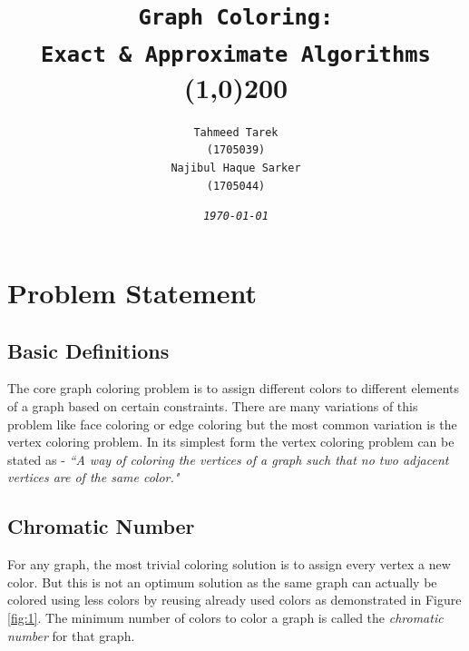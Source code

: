 \documentclass[14pt]{extreport}
\title{
	\texttt{Graph Coloring:} \\
	\texttt{Exact \& Approximate Algorithms} \\
	\line(1,0){200}
}
\author{
	\texttt{Tahmeed Tarek} \\
	\texttt{(1705039)} \vspace{10pt}\\ 
	\texttt{Najibul Haque Sarker} \\
	\texttt{(1705044)} \\
}
\date{
	\vspace{20pt}
	\small
	\texttt{\textit{\today}}
}
\begin{document}
	
	\maketitle
	\pagebreak
	
	\tableofcontents
	\pagebreak
	

	\chapter{Problem Statement}
	
    	\section{Basic Definitions}
	    	The core graph coloring problem is to assign different colors to different elements of a graph based on certain constraints. There are many variations of this problem like face coloring or edge coloring but the most common variation is the vertex coloring problem. In its simplest form the vertex coloring problem can be stated as - \emph{``A way of coloring the vertices of a graph such that no two adjacent vertices are of the same color."} 
	
    	\section{Chromatic Number}
	    	
	    	For any graph, the most trivial coloring solution is to assign every vertex a new color. But this is not an optimum solution as the same graph can actually be colored using less colors by reusing already used colors as demonstrated in Figure \ref{fig:1}. The minimum number of colors to color a graph is called the \emph{chromatic number} for that graph.
			
\end{document}
